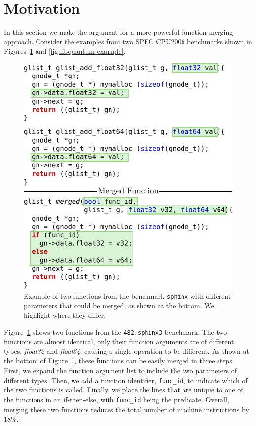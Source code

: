 \section{Motivation} \label{sec:motivation}

In this section we make the argument for a more powerful function merging
approach. Consider the examples from two SPEC CPU2006 benchmarks shown in
Figures~\ref{fig:sphinx-example} and \ref{fig:libquantum-example}.

\begin{figure}[t!]
  \centering
  \includegraphics[width=.95\linewidth]{figs/sphinx-example.pdf}
  \caption{Example of two functions from the benchmark \texttt{sphinx} with
	different parameters that could be merged, as shown at the bottom.
    We highlight where they differ.}
  \label{fig:sphinx-example}
\end{figure}

Figure~\ref{fig:sphinx-example} shows two functions from the
\texttt{482.sphinx3} benchmark. The two functions are almost identical, only
their function arguments are of different types, \textit{float32} and
\textit{float64}, causing a single operation to be different. As shown at the
bottom of Figure~\ref{fig:sphinx-example}, these functions can be easily merged
in three steps. First, we expand the function argument list to include the
two parameters of different types. Then, we add a function identifier,
\texttt{func\_id}, to indicate which of the two functions is called. Finally,
we place the lines that are unique to one of the functions in an if-then-else, with
\texttt{func\_id} being the predicate. Overall, merging these two functions
reduces the total number of machine instructions by 18\%.

